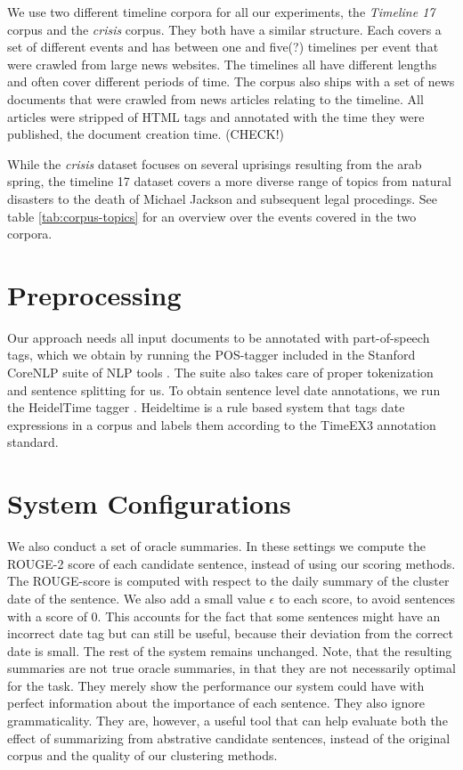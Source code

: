 \documentclass[a4paper,BCOR=10mm]{report}
\begin{document}
We use two different timeline corpora for all our experiments, the \textit{Timeline 17} corpus \citet{tran-tl17} and the \textit{crisis} corpus. They both have a similar structure. Each covers a set of different events and has between one and five(?) timelines per event that were crawled from large news websites. The timelines all have different lengths and often cover different periods of time. The corpus also ships with a set of news documents that were crawled from news articles relating to the timeline. All articles were stripped of HTML tags and annotated with the time they were published, the document creation time. (CHECK!)

While the \textit{crisis} dataset focuses on several uprisings resulting from the arab spring, the timeline 17 dataset covers a more diverse range of topics from natural disasters to the death of Michael Jackson and subsequent legal procedings. See table \ref{tab:corpus-topics} for an overview over the events covered in the two corpora.

\section{Preprocessing}

Our approach needs all input documents to be annotated with part-of-speech tags, which we obtain by running the POS-tagger included in the Stanford CoreNLP suite of NLP tools \citep{stanford-corenlp}. The suite also takes care of proper tokenization and sentence splitting for us.
To obtain sentence level date annotations, we run the HeidelTime tagger \citet{heideltime}. Heideltime is a rule based system that tags date expressions in a corpus and labels them according to the TimeEX3 annotation standard.

\section{System Configurations}

We also conduct a set of oracle summaries. In these settings we compute the ROUGE-2 score of each candidate sentence, instead of using our scoring methods. The ROUGE-score is computed with respect to the daily summary of the cluster date of the sentence. We also add a small value $\epsilon$ to each score, to avoid sentences with a score of 0. This accounts for the fact that some sentences might have an incorrect date tag but can still be useful, because their deviation from the correct date is small. The rest of the system remains unchanged. Note, that the resulting summaries are not true oracle summaries, in that they are not necessarily optimal for the task. They merely show the performance our system could have with perfect information about the importance of each sentence. They also ignore grammaticality.
They are, however, a useful tool that can help evaluate both the effect of summarizing from abstrative candidate sentences, instead of the original corpus and the quality of our clustering methods.
\end{document}
